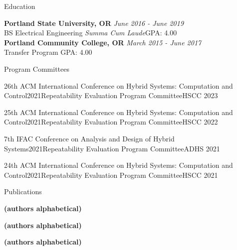 \documentclass{resume}
\begin{document}
\begin{rSection}{Education}

{\bf Portland State University, OR} \hfill {\em June 2016 - June 2019} 
\\ BS Electrical Engineering \quad \textit{Summa Cum Laude}\hfill {GPA: 4.00}
\\{\bf Portland Community College, OR} \hfill {\em March 2015 - June 2017} 
\\ Transfer Program \hfill {GPA: 4.00}

\end{rSection}

\begin{rSection}{Program Committees}

\begin{rSubsectionEmpty}{26th ACM International Conference on Hybrid Systems: Computation and Control}{2021}{Repeatability Evaluation Program Committee}{HSCC 2023}
\end{rSubsectionEmpty}

\begin{rSubsectionEmpty}{25th ACM International Conference on Hybrid Systems: Computation and Control}{2021}{Repeatability Evaluation Program Committee}{HSCC 2022}
\end{rSubsectionEmpty}


\begin{rSubsectionEmpty}{7th IFAC Conference on Analysis and Design of Hybrid Systems}{2021}{Repeatability Evaluation Program Committee}{ADHS 2021}
\end{rSubsectionEmpty}

\begin{rSubsectionEmpty}{24th ACM International Conference on Hybrid Systems: Computation and Control}{2021}{Repeatability Evaluation Program Committee}{HSCC 2021}
\end{rSubsectionEmpty}

\end{rSection}

\begin{rSection}{Publications}

\textbf{(authors alphabetical)} 

\textbf{(authors alphabetical)} 



\textbf{(authors alphabetical)} 

\end{rSection}
\end{document}

